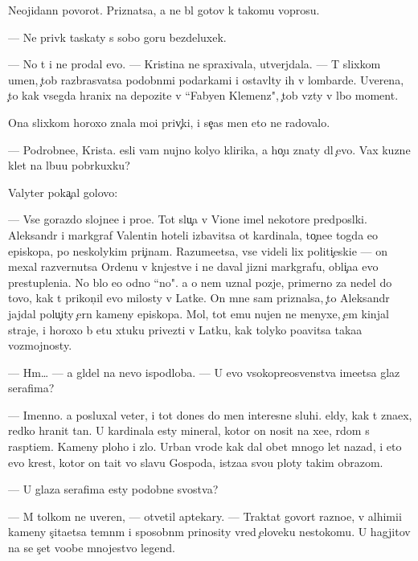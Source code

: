 \documentclass[10pt]{book}
\begin{document}
Neojidann{\yi}{\y} povorot. Priznatsa, {\y}a ne b{\yi}l gotov k takomu voprosu.

— Ne priv{\yi}k taskaty s sobo{\y} goru bezdeluxek.

— No t{\yi} i ne prodal {\y}evo. — Kristina ne spraxivala, utverjdala. — T{\yi} slixkom umen, {\c}tob{\yi} razbras{\yi}vatsa podobn{\yi}mi podarkami i ostavl{\ia}ty ih v lombarde. Uverena, {\c}to kak vsegda hranix na depozite v ``Fabyen Klemenz", {\c}tob{\yi} vz{\ia}ty v l{\iu}bo{\y} moment.

Ona slixkom horoxo znala mo{\y}i priv{\yi}{\c}ki, i se{\y}{\c}as men{\ia} eto ne radovalo.

— Podrobne{\y}e, Krista. {\Y}esli vam nujno koly{\q}o klirika, {\y}a ho{\c}u znaty dl{\ia} {\c}evo. Vax kuzne{\q} kl{\iu}{\y}et na l{\iu}bu{\y}u pobr{\ia}kuxku?

Valyter poka{\c}al golovo{\y}:

— Vse gorazdo slojne{\y}e i pro{\x}e. Tot slu{\c}a{\y} v Vione imel nekotor{\yi}{\y}e predpos{\yi}lki. Aleksandr i markgraf Valentin hoteli izbavitsa ot kardinala, to{\c}ne{\y}e togda {\y}e{\x}o {\y}episkopa, po neskolykim pri{\c}inam. Razume{\y}etsa, vse videli lix politi{\c}eski{\y}e — on mexal razvernutsa Ordenu v kn{\ia}jestve i ne daval jizni markgrafu, obli{\c}a{\y}a {\y}evo prestupleni{\y}a. No b{\yi}lo {\y}e{\x}o odno ``no". {\Y}a o nem uznal pozje, primerno za nedel{\iu} do tovo, kak t{\yi} prikon{\c}il {\y}evo milosty v Latke. On mne sam priznalsa, {\c}to Aleksandr jajdal polu{\c}ity {\c}ern{\yi}{\y} kameny {\y}episkopa. Mol, tot {\y}emu nujen ne menyxe, {\c}em kinjal{\yi} straje{\y}, i horoxo b{\yi} etu xtuku privezti v Latku, kak tolyko po{\y}avitsa taka{\y}a vozmojnosty.

— Hm… — {\Y}a gl{\ia}del na nevo ispodlob{\y}a. — U {\y}evo v{\yi}sokopreosv{\ia}{\x}enstva ime{\y}etsa glaz serafima?

— Imenno. {\Y}a posluxal veter, i tot dones do men{\ia} interesn{\yi}{\y}e sluhi. {\C}el{\ia}dy, kak t{\yi} zna{\y}ex, redko hranit ta{\y}n{\yi}. U kardinala {\y}esty mineral, kotor{\yi}{\y} on nosit na xe{\y}e, r{\ia}dom s rasp{\ia}ti{\y}em. Kameny ploho{\y} i zlo{\y}. Urban vrode kak dal obet mnogo let nazad, i eto {\y}evo krest, kotor{\yi}{\y} on ta{\x}it vo slavu Gospoda, ist{\ia}za{\y}a svo{\y}u ploty takim obrazom.

— U glaza serafima {\y}esty podobn{\yi}{\y}e svo{\y}stva?

— M{\yi} tolkom ne uveren{\yi}, — otvetil aptekary. — Traktat{\yi} govor{\ia}t razno{\y}e, v alhimi{\y}i kameny s{\c}ita{\y}etsa temn{\yi}m i sposobn{\yi}m prinosity vred {\c}eloveku nesto{\y}komu. U hagjitov na se{\y} s{\c}et voob{\x}e mnojestvo legend.
\end{document}
